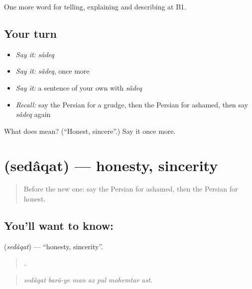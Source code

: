 \begin{grammarlens}[title={What you've built}]
One more word for telling, explaining and describing at B1.
\end{grammarlens}

\subsection*{Your turn}
\begin{itemize}
\raggedright
  \item \emph{Say it:} \emph{sâdeq}
  \item \emph{Say it:} \emph{sâdeq}, once more
  \item \emph{Say it:} a sentence of your own with \emph{sâdeq}
  \item \emph{Recall:} say the Persian for a grudge, then the Persian for ashamed, then say \emph{sâdeq} again
\end{itemize}

\begin{tcolorbox}[breakable,colback=teal!4,colframe=teal!35!black,title={Before you move on}]
What does  mean? (\textquotedblleft{}Honest, sincere\textquotedblright{}.) Say it once more.
\end{tcolorbox}
\section[\texorpdfstring{\fa{صداقت} (sedâqat)}{صداقت (sedâqat)}]{ (sedâqat) — honesty, sincerity}

\label{lesson:FA-C483-sedaqat}



\begin{quote}
Before the new one: say the Persian for ashamed, then the Persian for honest.
\end{quote}

\subsection*{You'll want to know: }
\textbf{} (\emph{sedâqat}) — \textquotedblleft{}honesty, sincerity\textquotedblright{}.

\begin{quote}
      .
\end{quote}

\begin{quote}
\emph{sedâqat barâ-ye man az pul mohemtar ast.}
\end{quote}

